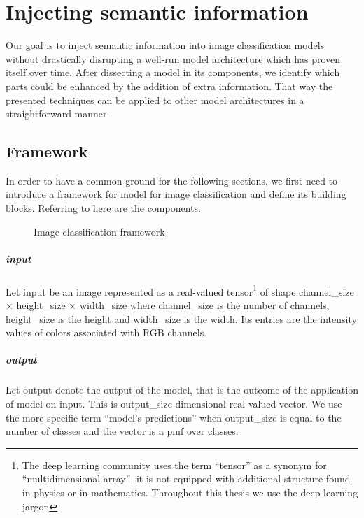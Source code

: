 \chapter{Injecting semantic information}
\label{ch:injecting-semantic-information}

Our goal is to inject semantic information into image classification models without drastically disrupting a well-run model architecture which has proven itself over time.
After dissecting a model in its components, we identify which parts could be enhanced by the addition of extra information. That way the presented techniques can be applied to other model architectures in a straightforward manner.

\section{Framework}
\label{sec:framework}

In order to have a common ground for the following sections, we first need to introduce a framework for model for image classification and define its building blocks. Referring to  here are the components.

\begin{figure}[htbp]
  \caption{Image classification framework}
  \label{fig:03/framework}
\end{figure}

\paragraph{input} Let \gls{input} be an image represented as a real-valued tensor\footnote{The deep learning community uses the term ``tensor'' as a synonym for ``multidimensional array'', it is not equipped with additional structure found in physics or in mathematics. Throughout this thesis we use the deep learning jargon} of shape \gls{channel_size} $\times$ \gls{height_size} $\times$ \gls{width_size} where \gls{channel_size} is the number of channels, \gls{height_size} is the height and \gls{width_size} is the width. Its entries are the intensity values of colors associated with RGB channels.

\paragraph{output} Let \gls{output} denote the output of the model, that is the outcome of the application of \gls{model} on \gls{input}. This is \gls{output_size}-dimensional real-valued vector. We use the more specific term ``model's predictions'' when \gls{output_size} is equal to the number of classes and the vector is a \acrfull{pmf} over classes.

